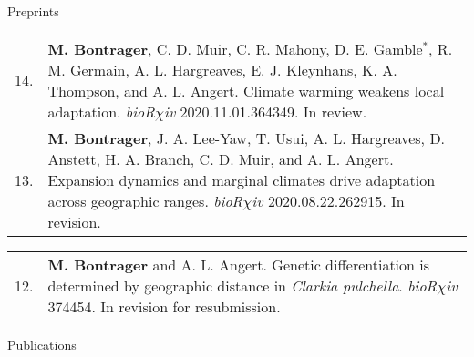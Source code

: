 \documentclass[letterpaper,11pt,oneside]{article}
\begin{document}
\noindent\Large{Preprints} 
\normalsize
\bigskip

\def\arraystretch{1.4}
\noindent \begin{tabular}{@{} p{0.5cm} >{\raggedright\arraybackslash}p{16.7cm}}
14. & \textbf{M. Bontrager}, C. D. Muir, C. R. Mahony, D. E. Gamble$^{*}$, R. M. Germain, A. L. Hargreaves, E. J. Kleynhans, K. A. Thompson, and A. L. Angert. Climate warming weakens local adaptation. \textit{bioR$\chi$iv} 2020.11.01.364349. In review. \\
13. & \textbf{M. Bontrager}, J. A. Lee-Yaw, T. Usui, A. L. Hargreaves, D. Anstett, H. A. Branch, C. D. Muir, and A. L. Angert. Expansion dynamics and marginal climates drive adaptation across geographic ranges. \textit{bioR$\chi$iv} 2020.08.22.262915. In revision. \\
 \end{tabular}
 
 \smallskip
 
 \def\arraystretch{1.4}
\noindent \begin{tabular}{@{} p{0.5cm} >{\raggedright\arraybackslash}p{16.7cm}}
12. & \textbf{M. Bontrager} and A. L. Angert. Genetic differentiation is determined by geographic distance in \textit{Clarkia pulchella}. \textit{bioR$\chi$iv} 374454. In revision for resubmission. \\
\end{tabular}

\bigskip
\bigskip
\smallskip




\noindent\Large{Publications}  
\normalsize
\bigskip
\end{document}

